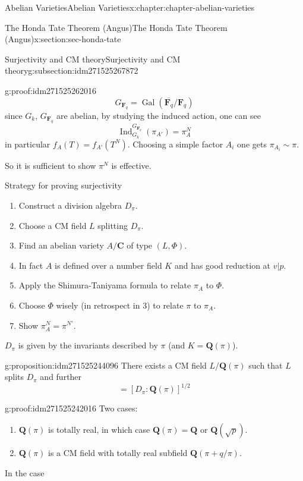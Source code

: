 \documentclass[oneside,10pt,]{book}
\numberwithin{equation}{section}
\newcommand{\QQ}{\mathbf{Q}}
\newcommand{\CC}{\mathbf{C}}
\newcommand{\FF}{\mathbf{F}}
\newcommand{\Gal}[2]{\operatorname{Gal}(#1/#2)}
\DeclareMathOperator{\Ind}{Ind}
\begin{document}
\begin{chapterptx}{Abelian Varieties}{}{Abelian Varieties}{}{}{x:chapter:chapter-abelian-varieties}
\begin{sectionptx}{The Honda Tate Theorem (Angus)}{}{The Honda Tate Theorem (Angus)}{}{}{x:section:sec-honda-tate}
\begin{subsectionptx}{Surjectivity and CM theory}{}{Surjectivity and CM theory}{}{}{g:subsection:idm271525267872}
\begin{proofptx}{}{g:proof:idm271525262016}
\begin{equation*}
\end{equation*}
%
\begin{equation*}
G_{\FF_q} = \Gal{\overline{\FF_q}}{\FF_q}
\end{equation*}
since \(G_k\), \(G_{\FF_q}\) are abelian, by studying the induced action, one can see%
\begin{equation*}
\Ind_{G_k}^{G_{\FF_q}} (\pi_{A'}) = \pi_A^N
\end{equation*}
in particular \(f_A(T) = f_{A'}(T^N)\). Choosing a simple factor \(A_i\) one gets \(\pi_{A_i} \sim \pi\).%
\end{proofptx}
So it is sufficient to show \(\pi^N\) is effective.%
\par
Strategy for proving surjectivity%
\begin{enumerate}
\item{}Construct a division algebra \(D_\pi\).%
\item{}Choose a CM field \(L\) splitting \(D_\pi\).%
\item{}Find an abelian variety \(A/\CC\) of type \((L, \Phi)\).%
\item{}In fact \(A\) is defined over  a number field \(K\) and has good reduction at \(v|p\).%
\item{}Apply the Shimura-Taniyama formula to relate \(\pi_A\) to \(\Phi\).%
\item{}Choose \(\Phi\) wisely (in retrospect in 3) to relate \(\pi\) to \(\pi_A\).%
\item{}Show \(\pi_A^N = \pi^{N'}\).%
\end{enumerate}
%
\par
\(D_\pi\) is given by the invariants described by \(\pi\) (and \(K = \QQ(\pi)\)).%
\begin{proposition}{}{}{g:proposition:idm271525244096}%
There exists a CM field \(L/\QQ(\pi)\) such that \(L\) splits \(D_\pi\) and further%
\begin{equation*}
[L:\QQ(\pi) ] = [ D_\pi: \QQ(\pi)]^{1/2}
\end{equation*}
%
\end{proposition}
\begin{proofptx}{}{g:proof:idm271525242016}
Two cases:%
\begin{enumerate}
\item{}\(\QQ(\pi)\) is totally real, in which case \(\QQ(\pi) = \QQ\) or \(\QQ(\sqrt{p})\).%
\item{}\(\QQ(\pi)\) is a CM field with totally real subfield \(\QQ(\pi + q/\pi)\).%
\end{enumerate}
In the case%

\end{proofptx}
\end{subsectionptx}
\end{sectionptx}
\end{chapterptx}
\end{document}
